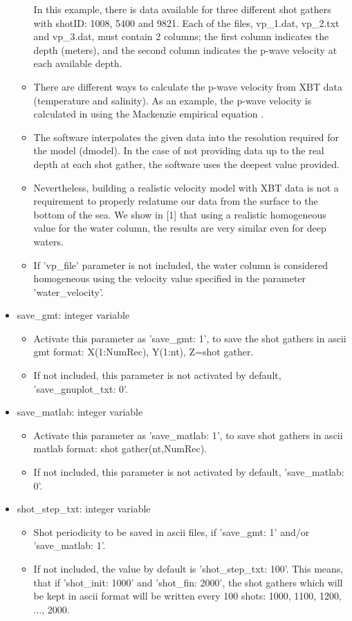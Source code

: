 \documentclass[11pt, oneside]{article}   	%
\begin{document}
\begin{itemize}
\begin{itemize}
	In this example, there is data available for three different shot gathers with shotID: 1008, 5400 and 9821. Each of the files, vp\_1.dat, vp\_2.txt and vp\_3.dat, must contain 2 columns; the first column indicates the depth (meters), and the second column indicates the p-wave velocity at each available depth. 
	\item There are different ways to calculate the p-wave velocity from XBT data (temperature and salinity). As an example, the p-wave velocity is calculated in \cite{estela} using the Mackenzie empirical equation \cite{Mackenzie}.
	\item The software interpolates the given data into the resolution required for the model (dmodel). In the case of not providing data up to the real depth at each shot gather, the software uses the deepest value provided.
	\item Nevertheless, building a realistic velocity model with XBT data is not a requirement to properly redatume our data from the surface to the bottom of the sea. We show in [1] that using a realistic homogeneous value for the water column, the results are very similar even for deep waters.
	\item If 'vp\_file' parameter is not included, the water column is considered homogeneous using the velocity value specified in the parameter 'water\_velocity'.
	\end{itemize}
  
  \item save\_gmt: integer variable 
	\begin{itemize}
	\item Activate this parameter as 'save\_gmt: 1', to save the shot gathers in ascii gmt format: X(1:NumRec), Y(1:nt), Z=shot gather.
	\item If not included, this parameter is not activated by default, 'save\_gnuplot\_txt: 0'.
	\end{itemize}

  \item save\_matlab: integer variable 
	\begin{itemize}
	\item Activate this parameter as 'save\_matlab: 1', to save shot gathers in ascii matlab format: shot gather(nt,NumRec).
	\item If not included, this parameter is not activated by default, 'save\_matlab: 0'.
	\end{itemize}

  \item shot\_step\_txt: integer variable 
  	\begin{itemize}
	\item Shot periodicity to be saved in ascii files, if 'save\_gmt: 1' and/or 'save\_matlab: 1'.
	\item If not included, the value by default is 'shot\_step\_txt: 100'. This means, that if 'shot\_init: 1000' and 'shot\_fin: 2000', the shot gathers which will be kept in ascii format will be written every 100 shots: 1000, 1100, 1200, ..., 2000.
	\end{itemize}

	
\end{itemize}
\end{document}
